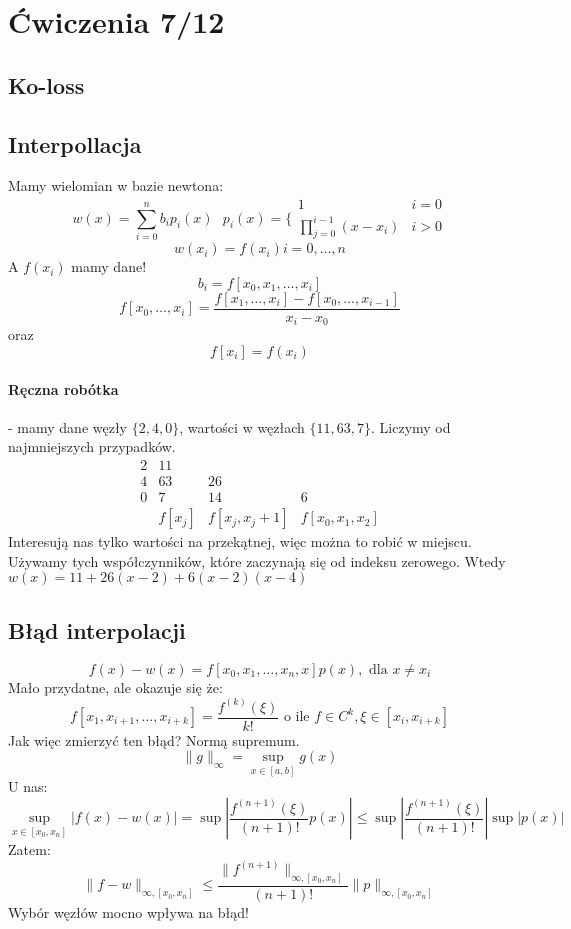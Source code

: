 \documentclass{article}
\begin{document}
\section{Ćwiczenia 7/12}
\subsection{Ko-loss}
\subsection{Interpollacja}
Mamy wielomian w bazie newtona:
$$w(x)=\sum_{i=0}^nb_ip_i(x)\ \ \  p_i(x)=\bigg\{\begin{matrix}
1&i=0\\\prod_{j=0}^{i-1}(x-x_i)&i>0
\end{matrix}$$
$$w(x_i)=f(x_i) i=0,\dots,n$$
A $ f(x_i) $ mamy dane!
$$b_i=f[x_0,x_1,\dots,x_i]$$
$$f[x_0,\dots,x_i]=
\frac{
	f[x_1,\dots,x_i]-f[x_0,\dots,x_{i-1}]
}{
	x_i-x_0
}$$
oraz
$$f[x_i]=f(x_i)$$
\paragraph{Ręczna robótka} - mamy dane węzły $ \{2,4,0\} $, wartości w węzłach $ \{11,63,7\} $. Liczymy od najmniejszych przypadków. 
$$
\begin{matrix}
2&11&&\\
4&63&26&\\
0&7&14&6\\
&f[x_j]&f[x_j,x_j+1]&f[x_0,x_1,x_2]
\end{matrix}
$$
Interesują nas tylko wartości na przekątnej, więc można to robić w miejscu. Używamy tych współczynników, które zaczynają się od indeksu zerowego. Wtedy $ w(x)=11+26(x-2)+6(x-2)(x-4) $
\subsection{Błąd interpolacji}
$$f(x)-w(x)=f[x_0,x_1,\dots,x_n,x]p(x), \text{ dla } x\not=x_i$$
Mało przydatne, ale okazuje się że:
$$f[x_1,x_{i+1},\dots,x_{i+k}]=\frac{f^{(k)}(\xi)}{k!}\text{ o ile } f\in C^k, \xi\in[x_i,x_{i+k}]$$
Jak więc zmierzyć ten błąd? Normą supremum. 
$$\|g\|_\infty=\sup_{x\in[a,b]}g(x)$$
U nas:
$$\sup_{x\in[x_0,x_n]}|f(x)-w(x)| = \sup|\frac{f^{(n+1)}(\xi)}{(n+1)!}p(x)| \le \sup|\frac{f^{(n+1)}(\xi)}{(n+1)!}|\sup|p(x)|$$
Zatem: $$\|f-w\|_{\infty, [x_0,x_n]} \le \frac{\|f^{(n+1)}\|_{\infty,[x_0,x_n]}}{(n+1)!} \|p\|_{\infty,[x_0,x_n]}$$
Wybór węzłów mocno wpływa na błąd!
\end{document}
